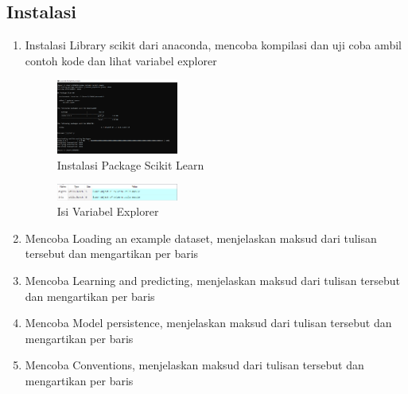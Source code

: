\subsection{Instalasi}
\begin{enumerate}
	\item Instalasi Library scikit dari anaconda, mencoba kompilasi dan uji coba ambil contoh kode dan lihat variabel explorer
	\hfill\break
	\begin{figure}[H]
		\includegraphics[width=4cm]{figures/1174069/1/1.png}
		\centering
		\caption{Instalasi Package Scikit Learn}
	\end{figure}
	\begin{figure}[H]
		\includegraphics[width=4cm]{figures/1174069/1/2.png}
		\centering
		\caption{Isi Variabel Explorer}
	\end{figure}
	\item Mencoba Loading an example dataset, menjelaskan maksud dari tulisan tersebut dan mengartikan           		  per baris
	\hfill\break
	
	\item Mencoba Learning and predicting, menjelaskan maksud dari tulisan tersebut dan mengartikan per  			  baris
	\hfill\break
	
	\item  Mencoba Model persistence, menjelaskan maksud dari tulisan tersebut dan mengartikan per baris
	\hfill\break
	
	\item Mencoba Conventions, menjelaskan maksud dari tulisan tersebut dan mengartikan per baris
	\hfill\break
	
\end{enumerate}

